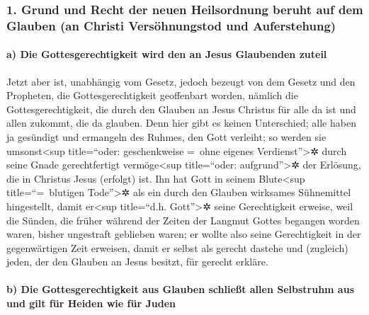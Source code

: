 \hypertarget{grund-und-recht-der-neuen-heilsordnung-beruht-auf-dem-glauben-an-christi-versuxf6hnungstod-und-auferstehung}{%
\subsubsection{1. Grund und Recht der neuen Heilsordnung beruht auf dem
Glauben (an Christi Versöhnungstod und
Auferstehung)}\label{grund-und-recht-der-neuen-heilsordnung-beruht-auf-dem-glauben-an-christi-versuxf6hnungstod-und-auferstehung}}

\hypertarget{a-die-gottesgerechtigkeit-wird-den-an-jesus-glaubenden-zuteil}{%
\paragraph{a) Die Gottesgerechtigkeit wird den an Jesus Glaubenden
zuteil}\label{a-die-gottesgerechtigkeit-wird-den-an-jesus-glaubenden-zuteil}}

 Jetzt aber ist, unabhängig vom Gesetz, jedoch bezeugt
von dem Gesetz und den Propheten, die Gottesgerechtigkeit geoffenbart
worden,  nämlich die Gottesgerechtigkeit, die durch den
Glauben an Jesus Christus für alle da ist und allen zukommt, die da
glauben. Denn hier gibt es keinen Unterschied;  alle
haben ja gesündigt und ermangeln des Ruhmes, den Gott verleiht;
 so werden sie umsonst\textless sup title=``oder:
geschenkweise =~ohne eigenes Verdienst''\textgreater✲ durch seine Gnade
gerechtfertigt vermöge\textless sup title=``oder:
aufgrund''\textgreater✲ der Erlösung, die in Christus Jesus (erfolgt)
ist.  Ihn hat Gott in seinem Blute\textless sup
title=``=~blutigen Tode''\textgreater✲ als ein durch den Glauben
wirksames Sühnemittel hingestellt, damit er\textless sup title=``d.h.
Gott''\textgreater✲ seine Gerechtigkeit erweise, weil die Sünden, die
früher während der Zeiten der Langmut Gottes begangen worden waren,
bisher ungestraft geblieben waren;  er wollte also seine
Gerechtigkeit in der gegenwärtigen Zeit erweisen, damit er selbst als
gerecht dastehe und (zugleich) jeden, der den Glauben an Jesus besitzt,
für gerecht erkläre.

\hypertarget{b-die-gottesgerechtigkeit-aus-glauben-schlieuxdft-allen-selbstruhm-aus-und-gilt-fuxfcr-heiden-wie-fuxfcr-juden}{%
\paragraph{b) Die Gottesgerechtigkeit aus Glauben schließt allen
Selbstruhm aus und gilt für Heiden wie für
Juden}\label{b-die-gottesgerechtigkeit-aus-glauben-schlieuxdft-allen-selbstruhm-aus-und-gilt-fuxfcr-heiden-wie-fuxfcr-juden}}

